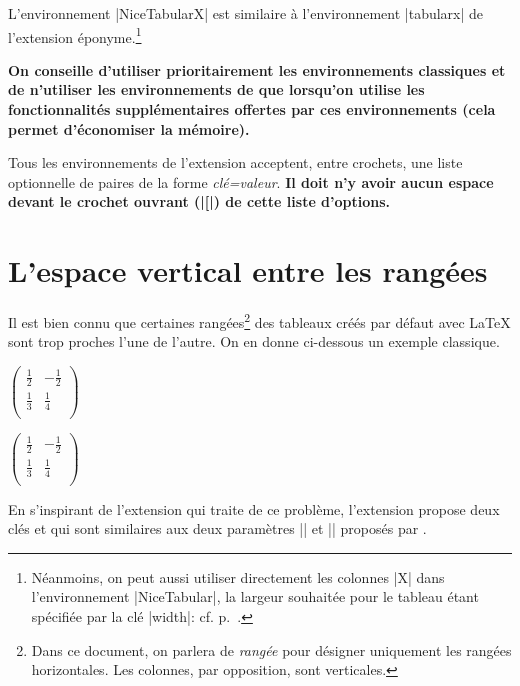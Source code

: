 \documentclass[dvipsnames]{article}%
\begin{document}
\medskip
L'environnement |{NiceTabularX}| est similaire à l'environnement |{tabularx}| de
l'extension éponyme.\footnote{Néanmoins, on peut aussi utiliser directement les
  colonnes |X| dans l'environnement |{NiceTabular}|, la largeur
  souhaitée pour le tableau étant spécifiée par la clé |width|: cf.
  p.~\pageref{colonne-X}.}


\medskip
\textbf{On conseille d'utiliser prioritairement les environnements classiques et de
n'utiliser les environnements de  que lorsqu'on utilise les
fonctionnalités supplémentaires offertes par ces environnements (cela permet
d'économiser la mémoire).}

\medskip
Tous les environnements de l'extension  acceptent, entre
crochets, une liste optionnelle de paires de la forme \textsl{clé=valeur}.
{\bfseries Il doit n'y avoir aucun espace devant le crochet ouvrant (|[|) de
  cette liste d'options.}


\section{L'espace vertical entre les rangées}

\label{cell-space}

Il est bien connu que certaines rangées\footnote{Dans ce document, on parlera de
  \emph{rangée} pour désigner uniquement les rangées horizontales. Les colonnes,
  par opposition, sont verticales.} des tableaux créés par défaut avec LaTeX
sont trop proches l'une de l'autre. On en donne ci-dessous un exemple classique.

\medskip
\begin{Code}[width=9cm]
$\begin{pmatrix}
\frac{1}{2} & -\frac{1}{2} \\
\frac{1}{3} & \frac{1}{4} \\
\end{pmatrix}$
\end{Code}
$\begin{pmatrix}
\frac{1}{2} & -\frac{1}{2} \\
\frac{1}{3} & \frac{1}{4} \\
\end{pmatrix}$

\medskip
En s'inspirant de l'extension  qui traite de ce problème,
l'extension  propose deux clés 
et  qui sont similaires aux deux paramètres
|\cellspacetoplimit| et |\cellspacebottomlimit| proposés par .
\end{document}
